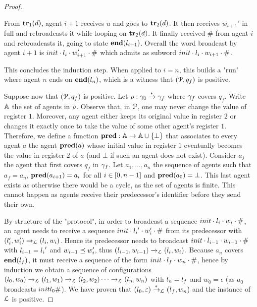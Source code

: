\begin{proof}
\begin{itemize}
		From $\mathbf{tr}_1(d)$, agent $i+1$ receives $u$ and goes to $\mathbf{tr}_2(d)$. It then receives $w_{i+1}'$ in full and rebroadcasts it while looping on $\mathbf{tr}_2(d)$. It finally received $\mathsf{\#}$ from agent $i$ and rebroadcasts it, going to state $\mathbf{end}(l_{i+1})$. Overall the word broadcast by agent $i+1$ is $\mathsf{init} \cdot \mathsf{\lstate_i} \cdot w_{i+1}'  \cdot \mathsf{\#}$ which admits as subword $\mathsf{init} \cdot \mathsf{\lstate_i} \cdot w_{i+1} \cdot \mathsf{\#}$.
	\end{itemize}
	This concludes the induction step.
	When applied to $i=n$, this builds a "run" where agent $n$ ends on $\mathbf{end}(l_n)$, which is a witness that $(\mathcal{P}, q_f)$ is positive.
	
	Suppose now that $(\mathcal{P}, q_f)$ is positive. Let $\rho: \gamma_0 \xrightarrow{*} \gamma_f$ where $\gamma_f$ covers $q_f$. 
	Write $\mathbb{A}$ the set of agents in $\rho$. Observe that, in $\mathcal{P}$, one may never change the value of register $1$. 
	Moreover, any agent either keeps its original value in register $2$ or changes it exactly once to take the value of some other agent's register $1$. Therefore, we define a function $\mathbf{pred}: \mathbb{A} \rightarrow \mathbb{A} \cup \{\bot\}$ that associates to every agent $a$ the agent $\mathbf{pred}(a)$ whose initial value in register $1$ eventually becomes the value in register $2$ of $a$ (and $\bot$ if such an agent does not exist). Consider $a_f$ the agent that first covers $q_f$ in $\gamma_f$. Let $a_1, \dots ,a_n$ the sequence of agents such that $a_f = a_n$, $\mathbf{pred}(a_{i+1}) = a_i$ for all $i \in [0,n-1]$ and $\mathbf{pred}(a_0) = \bot$. This last agent exists as otherwise there would be a cycle, as the set of agents is finite. This cannot happen as agents receive their predecessor's identifier before they send their own. 
	
	
	By structure of the "protocol", in order to broadcast a sequence $\mathsf{init} \cdot \mathsf{\lstate_i} \cdot w_i \cdot \mathsf{\#}$, an agent needs to receive a sequence $\mathsf{init} \cdot \mathsf{\lstate_{i}}' \cdot w'_i \cdot \mathsf{\#}$ from its predecessor with $(l'_i, w'_i) \xrightarrow{}_{\mathcal{L}} (l_i, w_i)$. Hence its predecessor needs to broadcast $\mathsf{init} \cdot \mathsf{\lstate_{i-1}} \cdot w_{i-1} \cdot \mathsf{\#}$ with $\mathsf{\lstate_{i-1}} = \mathsf{\lstate_{i}}'$ and $w_{i-1} \preceq w_i'$, thus $(l_{i-1}, w_{i-1}) \xrightarrow{}_{\mathcal{L}} (l_i, w_i)$.
	Because $a_n$ covers $\mathbf{end}(l_f)$, it must receive a sequence of the form $\mathsf{init} \cdot \mathsf{\lstate_f} \cdot w_n \cdot \mathsf{\#}$, hence by induction we obtain a sequence of configurations $(l_0, w_0) \xrightarrow{}_{\mathcal{L}} (l_1, w_1) \xrightarrow{}_{\mathcal{L}} (l_2, w_2) \cdots \xrightarrow{}_{\mathcal{L}} (l_n,w_n)$ with $l_n = l_f$ and $w_0 = \epsilon$ (as $a_0$ broadcasts $init \lstate_0 \mathsf{\#}$). 
 	We have proven that $(l_0, \varepsilon) \xrightarrow{*}_{\mathcal{L}} (l_f, w_n)$ and the instance of $\mathcal{L}$ is positive. 
\end{proof}
